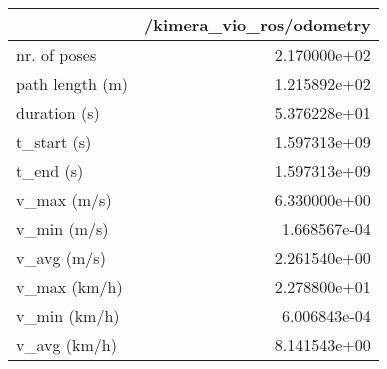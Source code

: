 \begin{tabular}{lr}
\toprule
{} &  /kimera\_vio\_ros/odometry \\
\midrule
nr. of poses    &              2.170000e+02 \\
path length (m) &              1.215892e+02 \\
duration (s)    &              5.376228e+01 \\
t\_start (s)     &              1.597313e+09 \\
t\_end (s)       &              1.597313e+09 \\
v\_max (m/s)     &              6.330000e+00 \\
v\_min (m/s)     &              1.668567e-04 \\
v\_avg (m/s)     &              2.261540e+00 \\
v\_max (km/h)    &              2.278800e+01 \\
v\_min (km/h)    &              6.006843e-04 \\
v\_avg (km/h)    &              8.141543e+00 \\
\bottomrule
\end{tabular}
